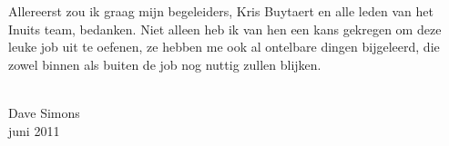 %
%
%
%
Allereerst zou ik graag mijn begeleiders, Kris Buytaert en alle leden van het Inuits team, bedanken. Niet alleen heb ik van hen een kans gekregen om deze leuke job uit te oefenen, ze hebben me ook al ontelbare dingen bijgeleerd, die zowel binnen als buiten de job nog nuttig zullen blijken.\\\\

\begin{flushright}Dave Simons\\juni 2011\end{flushright}
